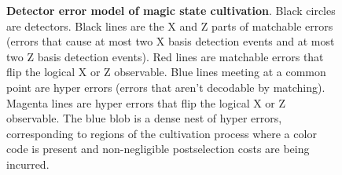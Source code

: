 \documentclass[onecolumn,unpublished,a4paper]{quantumarticle}
\theoremstyle{definition}
\begin{document}
\begin{figure}
    \centering
    \caption{
        \textbf{Detector error model of magic state cultivation}.
        Black circles are detectors.
        Black lines are the X and Z parts of matchable errors (errors that cause at most two X basis detection events and at most two Z basis detection events).
        Red lines are matchable errors that flip the logical X or Z observable.
        Blue lines meeting at a common point are hyper errors (errors that aren't decodable by matching).
        Magenta lines are hyper errors that flip the logical X or Z observable.
        The blue blob is a dense nest of hyper errors, corresponding to regions of the cultivation process where a color code is present and non-negligible postselection costs are being incurred.
    }
    \label{fig:dem-diagram}
\end{figure}
\end{document}
